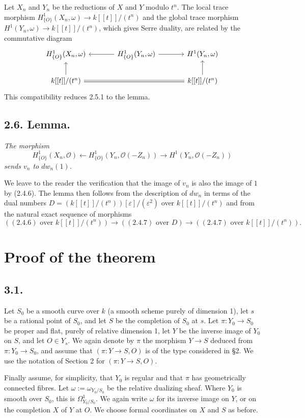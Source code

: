 \documentclass[11pt]{article}
\newcommand{\OO}{\mathcal O}
\begin{document}
Let $X_n$ and $Y_n$ be the reductions of $X$ and $Y$ modulo $t^n$. The local trace morphism $H^1_{\{O\}}(X_n,\omega)\to k[[t]]/(t^n)$ and the global trace morphism $H^1(Y_n,\omega)\to k[[t]]/(t^n)$, which gives Serre duality, are related by the commutative diagram
\[
\begin{tikzcd}[column sep=large]
H^1_{\{O\}}(X_n,\omega) & H^1_{\{O\}}(Y_n,\omega) \arrow[l] \arrow[r] & H^1(Y_n,\omega) \\
k[[t]]/(t^n) \arrow[u] \arrow[rr,equal] & & k[[t]]/(t^n) \arrow[u]
\end{tikzcd}
\]
This compatibility reduces 2.5.1 to the lemma.

\subsection*{2.6. Lemma.}
\emph{The morphism}
\[
        H^1_{\{O\}}(X_n,\OO)\longleftarrow H^1_{\{O\}}(Y_n,\OO(-Z_n))\longrightarrow H^1(Y_n,\OO(-Z_n))
\]
\emph{sends $v_n$ to $dw_n(1)$.}

We leave to the reader the verification that the image of $v_n$ is also the image of $1$ by (2.4.6). The lemma then follows from the description of $dw_n$ in terms of the dual numbers $D=(k[[t]]/(t^n))[\varepsilon]/(\varepsilon^2)$ over $k[[t]]/(t^n)$ and from the natural exact sequence of morphisms
\[
        ((2.4.6)\text{ over }k[[t]]/(t^n))\longrightarrow ((2.4.7)\text{ over }D)
        \longrightarrow ((2.4.7)\text{ over }k[[t]]/(t^n)).
\]

\section{Proof of the theorem}

\subsection*{3.1.}
Let $S_0$ be a smooth curve over $k$ (a smooth scheme purely of dimension 1), let $s$ be a rational point of $S_0$, and let $S$ be the completion of $S_0$ at $s$. Let $\pi:Y_0\to S_0$ be proper and flat, purely of relative dimension 1, let $Y$ be the inverse image of $Y_0$ on $S$, and let $O\in Y_s$. We again denote by $\pi$ the morphism $Y\to S$ deduced from $\pi:Y_0\to S_0$, and assume that $(\pi:Y\to S,O)$ is of the type considered in §2. We use the notation of Section 2 for $(\pi:Y\to S,O)$.

Finally assume, for simplicity, that $Y_0$ is regular and that $\pi$ has geometrically connected fibres. Let $\omega:=\omega_{Y_0/S_0}$ be the relative dualizing sheaf. Where $Y_0$ is smooth over $S_0$, this is $\Omega^1_{Y_0/S_0}$. We again write $\omega$ for its inverse image on $Y$, or on the completion $X$ of $Y$ at $O$. We choose formal coordinates on $X$ and $S$ as before.
\end{document}
